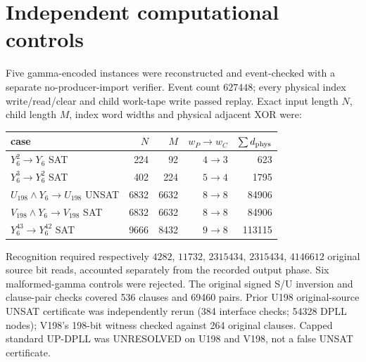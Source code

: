 \documentclass[11pt]{article}
\begin{document}
\section{Independent computational controls}
Five gamma-encoded instances were reconstructed and event-checked with a separate no-producer-import verifier. Event count $627448$; every physical index write/read/clear and child work-tape write passed replay. Exact input length $N$, child length $M$, index word widths and physical adjacent XOR were:
\begin{center}\begin{tabular}{lrrrr}
\toprule case & $N$ & $M$ & $w_P\to w_C$ & $\sum d_{\rm phys}$\\
\midrule
$Y_6^2\to Y_6$ SAT &224&92&$4\to3$&623\\
$Y_6^3\to Y_6^2$ SAT &402&224&$5\to4$&1795\\
$U_{198}\wedge Y_6\to U_{198}$ UNSAT &6832&6632&$8\to8$&84906\\
$V_{198}\wedge Y_6\to V_{198}$ SAT &6832&6632&$8\to8$&84906\\
$Y_6^{43}\to Y_6^{42}$ SAT &9666&8432&$9\to8$&113115\\
\bottomrule\end{tabular}\end{center}
Recognition required respectively $4282$, $11732$, $2315434$, $2315434$, $4146612$ original source bit reads, accounted separately from the recorded output phase. Six malformed-gamma controls were rejected. The original signed S/U inversion and clause-pair checks covered 536 clauses and 69460 pairs. Prior U198 original-source UNSAT certificate was independently rerun (384 interface checks; 54328 DPLL nodes); V198's 198-bit witness checked against 264 original clauses. Capped standard UP-DPLL was UNRESOLVED on U198 and V198, not a false UNSAT certificate.
\end{document}
